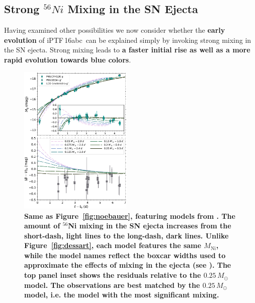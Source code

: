 \documentclass[twocolumn]{aastex61}
\newcommand{\abc}{iPTF\,16abc}
\begin{document}
\subsection{Strong $^{56}Ni$ Mixing in the SN Ejecta}
\label{sec:Ni_mixing}

Having examined other possibilities we now consider whether the \textbf{early evolution} of \abc\ can be explained simply by invoking strong mixing in the 
SN ejecta. Strong mixing leads to \textbf{a faster initial rise as well as a more rapid evolution towards blue colors}.

\begin{figure}[]
  \centering
  \includegraphics[width=0.48\textwidth]{compare_Piro.pdf}
  \caption{  
  \textbf{Same as Figure~\ref{fig:noebauer}, featuring models from
  \citet{2016ApJ...826...96P}. The amount of $^{56}$Ni mixing in the SN ejecta
  increases from the short-dash, light lines to the long-dash, dark lines.
  Unlike Figure~\ref{fig:dessart}, each model features the same
  $M_\mathrm{Ni}$, while the model names reflect the boxcar widths used to
  approximate the effects of mixing in the ejecta (see
  \citealt{2016ApJ...826...96P}). The top panel inset shows the
  residuals relative to the $0.25\,M_\odot$ model. The observations are best
  matched by the $0.25\,M_\odot$ model, i.e. the model with the most
  significant mixing.}
  }
  \label{fig:piro}
\end{figure}
\end{document}
